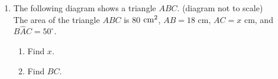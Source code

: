 \documentclass[12pt, twoside]{article}
\begin{document}
\begin{enumerate}
\item The following diagram shows a triangle $ABC$. \hfill (diagram not to scale)\\[0.5cm]
The area of the triangle $ABC$ is 80 $\rm{cm}^2$, $AB=18$ cm, $AC=x$ cm, and $B\hat{A}C = 50^\circ$.
  \begin{multicols}{2}
    \begin{enumerate}
      \item Find $x$.
      \item Find $BC$.
    \end{enumerate}
  \end{multicols}
  \vspace{1cm}

\end{enumerate}
\end{document}
